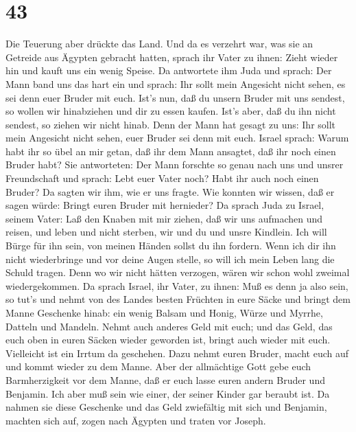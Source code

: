 \hypertarget{section-42}{%
\section{43}\label{section-42}}

 Die Teuerung aber drückte das Land.  Und da es
verzehrt war, was sie an Getreide aus Ägypten gebracht hatten, sprach
ihr Vater zu ihnen: Zieht wieder hin und kauft uns ein wenig Speise.
 Da antwortete ihm Juda und sprach: Der Mann band uns das
hart ein und sprach: Ihr sollt mein Angesicht nicht sehen, es sei denn
euer Bruder mit euch.  Ist's nun, daß du unsern Bruder mit
uns sendest, so wollen wir hinabziehen und dir zu essen kaufen.
 Ist's aber, daß du ihn nicht sendest, so ziehen wir nicht
hinab. Denn der Mann hat gesagt zu uns: Ihr sollt mein Angesicht nicht
sehen, euer Bruder sei denn mit euch.  Israel sprach: Warum
habt ihr so übel an mir getan, daß ihr dem Mann ansagtet, daß ihr noch
einen Bruder habt?  Sie antworteten: Der Mann forschte so
genau nach uns und unsrer Freundschaft und sprach: Lebt euer Vater noch?
Habt ihr auch noch einen Bruder? Da sagten wir ihm, wie er uns fragte.
Wie konnten wir wissen, daß er sagen würde: Bringt euren Bruder mit
hernieder?  Da sprach Juda zu Israel, seinem Vater: Laß den
Knaben mit mir ziehen, daß wir uns aufmachen und reisen, und leben und
nicht sterben, wir und du und unsre Kindlein.  Ich will
Bürge für ihn sein, von meinen Händen sollst du ihn fordern. Wenn ich
dir ihn nicht wiederbringe und vor deine Augen stelle, so will ich mein
Leben lang die Schuld tragen.  Denn wo wir nicht hätten
verzogen, wären wir schon wohl zweimal wiedergekommen.  Da
sprach Israel, ihr Vater, zu ihnen: Muß es denn ja also sein, so tut's
und nehmt von des Landes besten Früchten in eure Säcke und bringt dem
Manne Geschenke hinab: ein wenig Balsam und Honig, Würze und Myrrhe,
Datteln und Mandeln.  Nehmt auch anderes Geld mit euch; und
das Geld, das euch oben in euren Säcken wieder geworden ist, bringt auch
wieder mit euch. Vielleicht ist ein Irrtum da geschehen. 
Dazu nehmt euren Bruder, macht euch auf und kommt wieder zu dem Manne.
 Aber der allmächtige Gott gebe euch Barmherzigkeit vor dem
Manne, daß er euch lasse euren andern Bruder und Benjamin. Ich aber muß
sein wie einer, der seiner Kinder gar beraubt ist.  Da
nahmen sie diese Geschenke und das Geld zwiefältig mit sich und
Benjamin, machten sich auf, zogen nach Ägypten und traten vor Joseph.
